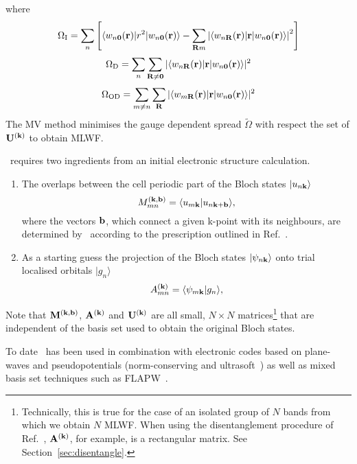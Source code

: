 where
\begin{equation}
\Omega_{{\rm I}}=\sum_n \left[\langle w_{n{\bf 0}}({\bf r})| r^2 | w_{n{\bf
      0}}({\bf r}) \rangle - \sum_{{\bf R}m} \left| \langle w_{n{\bf
      R}}({\bf r})| {\bf r} | w_{n{\bf 0}}({\bf r}) \rangle \right| ^2
      \right] 
\end{equation}
\begin{equation}
\Omega_{\rm D}=\sum_n \sum_{{\bf R}\neq{\bf 0}} |\langle w_{n{\bf
    R}}({\bf r})| {\bf r} | w_{n{\bf 0}}({\bf r}) \rangle|^2 
\end{equation}
\begin{equation}
\Omega_{\rm OD}=\sum_{m\neq n} \sum_{{\bf R}} |\langle w_{m{\bf R}}({\bf
  r})| {\bf r} | w_{n{\bf 0}}({\bf r}) \rangle |^2 
\end{equation}
The MV method minimises the gauge dependent spread $\tilde{\Omega}$
with respect the set of $\mathbf{U}^{(\mathbf{k})}$ to obtain MLWF.

\wannier\ requires two ingredients from an initial electronic
structure calculation. 
\begin{enumerate}
\item The overlaps between the cell periodic part of the Bloch states
  $|u_{n{\bf k}}\rangle$  
\begin{equation}
M_{mn}^{(\bf{k,b})}=\langle u_{m{\bf k}}|u_{n{\bf k}+{\bf b}}\rangle,
\end{equation}
where the vectors ${\bf b}$, which connect a given k-point with its
neighbours, are determined 
by \wannier\ according to the prescription outlined in Ref.~\cite{MV}.
\item As a starting guess the projection of the Bloch states
  $|\psi_{n\bf{k}}\rangle$ onto trial localised orbitals $|g_{n}\rangle$ 
\begin{equation}
A_{mn}^{(\bf{k})}=\langle \psi_{m{\bf k}}|g_{n}\rangle,
\end{equation}
\end{enumerate}
Note that $\mathbf{M}^{(\mathbf{k},\mathbf{b})}$, $\mathbf{A}^{(\mathbf{k})}$ and $\mathbf{U}^{(\mathbf{k})}$ are all small, $N \times
N$ matrices\footnote{Technically, this is true for the case of an
  isolated group of $N$ bands from which we obtain $N$ MLWF. When
  using the disentanglement procedure of Ref.~\cite{SMV}, $\mathbf{A}^{(\mathbf{k})}$, for
  example, is a rectangular matrix. See Section~\ref{sec:disentangle}.}
that are independent of the basis set used to obtain the original
Bloch states.

To date \wannier\ has been used in combination with electronic codes
based on plane-waves and pseudopotentials (norm-conserving and
ultrasoft~\cite{USPP}) as well as mixed basis set techniques such as
FLAPW~\cite{MnO}.

